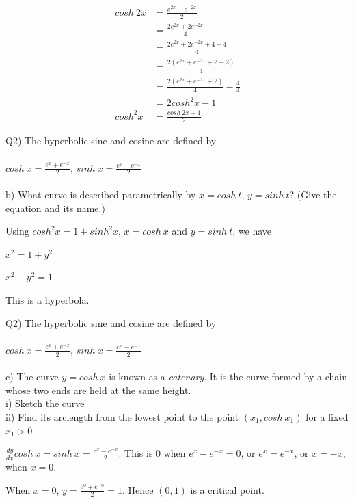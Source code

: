 \documentclass[9pt]{article}
\begin{document}
\begin{align*}
  cosh\ 2x &= \frac{e^{2x} + e^{-2x}}{2} \\
  &= \frac{2e^{2x} + 2e^{-2x}}{4} \\
  &= \frac{2e^{2x} + 2e^{-2x} + 4 - 4}{4} \\
  &= \frac{2(e^{2x} + e^{-2x} + 2 - 2)}{4} \\
  &= \frac{2(e^{2x} + e^{-2x} + 2)}{4} - \frac{4}{4} \\
  &= 2cosh^2 x - 1 \\
  cosh^2 x &= \frac{cosh\ 2x + 1}{2}
\end{align*}


\begin{tcolorbox}
  Q2) The hyperbolic sine and cosine are defined by \\
  \\
  $cosh \ x = \frac{e^x + e^{-x}}{2}$, $sinh \ x = \frac{e^x - e^{-x}}{2}$ \\
  \\
  b) What curve is described parametrically by $x = cosh\ t$, $y = sinh\ t$? (Give the equation and its name.)
\end{tcolorbox}

Using $cosh^2 x = 1 + sinh^2 x$, $x = cosh\ x$ and $y = sinh \ t$, we have

$x^2 = 1 + y^2$

$x^2 - y^2 = 1$

This is a hyperbola.


\begin{tcolorbox}
  Q2) The hyperbolic sine and cosine are defined by \\
  \\
  $cosh \ x = \frac{e^x + e^{-x}}{2}$, $sinh \ x = \frac{e^x - e^{-x}}{2}$ \\
  \\
  c) The curve $y = cosh \ x$ is known as a \textit{catenary}. It is the curve formed by a chain whose two ends are held at the same height.\\
  i) Sketch the curve \\
  ii) Find its arclength from the lowest point to the point $(x_1, cosh\ x_1)$ for a fixed $x_1 > 0$
\end{tcolorbox}

$\frac{dy}{dx} cosh\ x = sinh\ x = \frac{e^x - e^{-x}}{2}$. This is $0$ when $e^x - e^{-x} = 0$, or $e^x = e^{-x}$, or $x = -x$, when $x = 0$.

When $x = 0$, $y = \frac{e^0 + e^{-0}}{2} = 1$. Hence $(0, 1)$ is a critical point.
\end{document}
